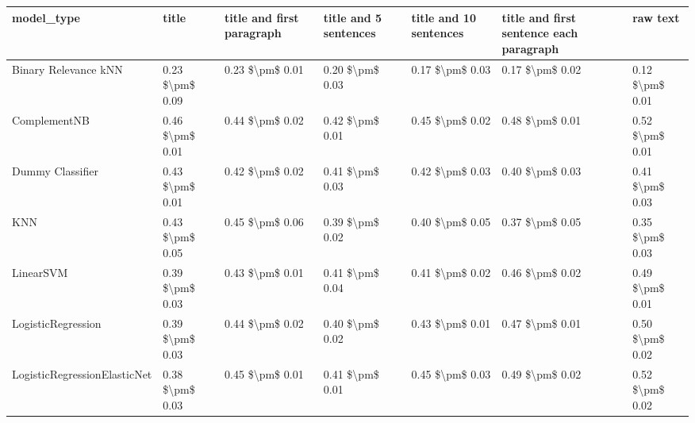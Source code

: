 \begin{tabular}{lllllll}
\toprule
                     model\_type &           title & title and first paragraph & title and 5 sentences & title and 10 sentences & title and first sentence each paragraph &            raw text \\
\midrule
           Binary Relevance kNN & 0.23 \$\textbackslash pm\$ 0.09 &           0.23 \$\textbackslash pm\$ 0.01 &       0.20 \$\textbackslash pm\$ 0.03 &        0.17 \$\textbackslash pm\$ 0.03 &                         0.17 \$\textbackslash pm\$ 0.02 &     0.12 \$\textbackslash pm\$ 0.01 \\
                   ComplementNB & 0.46 \$\textbackslash pm\$ 0.01 &           0.44 \$\textbackslash pm\$ 0.02 &       0.42 \$\textbackslash pm\$ 0.01 &        0.45 \$\textbackslash pm\$ 0.02 &                         0.48 \$\textbackslash pm\$ 0.01 &     0.52 \$\textbackslash pm\$ 0.01 \\
               Dummy Classifier & 0.43 \$\textbackslash pm\$ 0.01 &           0.42 \$\textbackslash pm\$ 0.02 &       0.41 \$\textbackslash pm\$ 0.03 &        0.42 \$\textbackslash pm\$ 0.03 &                         0.40 \$\textbackslash pm\$ 0.03 &     0.41 \$\textbackslash pm\$ 0.03 \\
                            KNN & 0.43 \$\textbackslash pm\$ 0.05 &           0.45 \$\textbackslash pm\$ 0.06 &       0.39 \$\textbackslash pm\$ 0.02 &        0.40 \$\textbackslash pm\$ 0.05 &                         0.37 \$\textbackslash pm\$ 0.05 &     0.35 \$\textbackslash pm\$ 0.03 \\
                      LinearSVM & 0.39 \$\textbackslash pm\$ 0.03 &           0.43 \$\textbackslash pm\$ 0.01 &       0.41 \$\textbackslash pm\$ 0.04 &        0.41 \$\textbackslash pm\$ 0.02 &                         0.46 \$\textbackslash pm\$ 0.02 &     0.49 \$\textbackslash pm\$ 0.01 \\
             LogisticRegression & 0.39 \$\textbackslash pm\$ 0.03 &           0.44 \$\textbackslash pm\$ 0.02 &       0.40 \$\textbackslash pm\$ 0.02 &        0.43 \$\textbackslash pm\$ 0.01 &                         0.47 \$\textbackslash pm\$ 0.01 &     0.50 \$\textbackslash pm\$ 0.02 \\
   LogisticRegressionElasticNet & 0.38 \$\textbackslash pm\$ 0.03 &           0.45 \$\textbackslash pm\$ 0.01 &       0.41 \$\textbackslash pm\$ 0.01 &        0.45 \$\textbackslash pm\$ 0.03 &                         0.49 \$\textbackslash pm\$ 0.02 &     0.52 \$\textbackslash pm\$ 0.02 \\

\end{tabular}
